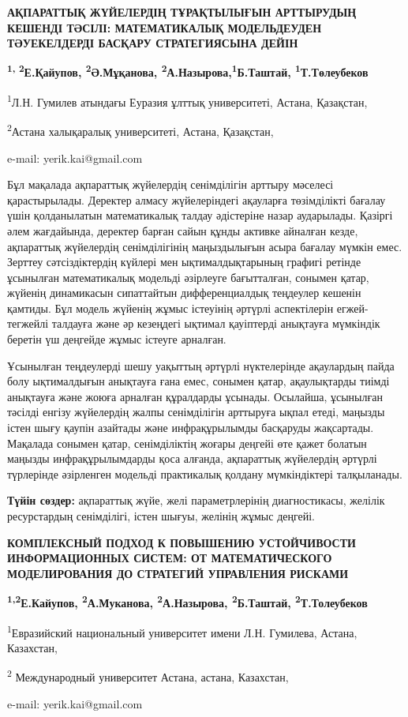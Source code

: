 \begin{center}
{\large\bfseries АҚПАРАТТЫҚ ЖҮЙЕЛЕРДІҢ ТҰРАҚТЫЛЫҒЫН АРТТЫРУДЫҢ КЕШЕНДІ ТӘСІЛІ:
МАТЕМАТИКАЛЫҚ МОДЕЛЬДЕУДЕН ТӘУЕКЕЛДЕРДІ БАСҚАРУ СТРАТЕГИЯСЫНА ДЕЙІН}

{\bfseries \textsuperscript{1, 2}Е.Қайупов, \textsuperscript{2}Ә.Мұқанова,
\textsuperscript{2}А.Назырова,\textsuperscript{1}Б.Таштай,
\textsuperscript{1}Т.Төлеубеков}

\textsuperscript{1}Л.Н. Гумилев атындағы Еуразия ұлттық университеті,
Астана, Қазақстан,

\textsuperscript{2}Астана халықаралық университеті, Астана, Қазақстан,

e-mail: yerik.kai@gmail.com
\end{center}

Бұл мақалада ақпараттық жүйелердің сенімділігін арттыру мәселесі
қарастырылады. Деректер алмасу жүйелеріндегі ақауларға төзімділікті
бағалау үшін қолданылатын математикалық талдау әдістеріне назар
аударылады. Қазіргі әлем жағдайында, деректер барған сайын құнды активке
айналған кезде, ақпараттық жүйелердің сенімділігінің маңыздылығын асыра
бағалау мүмкін емес. Зерттеу сәтсіздіктердің күйлері мен
ықтималдықтарының графигі ретінде ұсынылған математикалық модельді
әзірлеуге бағытталған, сонымен қатар, жүйенің динамикасын сипаттайтын
дифференциалдық теңдеулер кешенін қамтиды. Бұл модель жүйенің жұмыс
істеуінің әртүрлі аспектілерін егжей-тегжейлі талдауға және әр кезеңдегі
ықтимал қауіптерді анықтауға мүмкіндік беретін үш деңгейде жұмыс істеуге
арналған.

Ұсынылған теңдеулерді шешу уақыттың әртүрлі нүктелерінде ақаулардың
пайда болу ықтималдығын анықтауға ғана емес, сонымен қатар, ақаулықтарды
тиімді анықтауға және жоюға арналған құралдарды ұсынады. Осылайша,
ұсынылған тәсілді енгізу жүйелердің жалпы сенімділігін арттыруға ықпал
етеді, маңызды істен шығу қаупін азайтады және инфрақұрылымды басқаруды
жақсартады. Мақалада сонымен қатар, сенімділіктің жоғары деңгейі өте
қажет болатын маңызды инфрақұрылымдарды қоса алғанда, ақпараттық
жүйелердің әртүрлі түрлерінде әзірленген модельді практикалық қолдану
мүмкіндіктері талқыланады.

{\bfseries Түйін сөздер:} ақпараттық жүйе, желі параметрлерінің
диагностикасы, желілік ресурстардың сенімділігі, істен шығуы, желінің
жұмыс деңгейі.

\begin{center}
{\large\bfseries КОМПЛЕКСНЫЙ ПОДХОД К ПОВЫШЕНИЮ УСТОЙЧИВОСТИ ИНФОРМАЦИОННЫХ
СИСТЕМ: ОТ МАТЕМАТИЧЕСКОГО МОДЕЛИРОВАНИЯ ДО СТРАТЕГИЙ УПРАВЛЕНИЯ
РИСКАМИ}

{\bfseries \textsuperscript{1,2}Е.Кайупов, \textsuperscript{2}А.Муканова,
\textsuperscript{2}А.Назырова, \textsuperscript{2}Б.Таштай,
\textsuperscript{2}Т.Толеубеков}

\textsuperscript{1}Евразийский национальный университет имени Л.Н.
Гумилева, Астана, Казахстан,

\textsuperscript{2} Международный университет Астана, астана, Казахстан,

e-mail: yerik.kai@gmail.com
\end{center}

